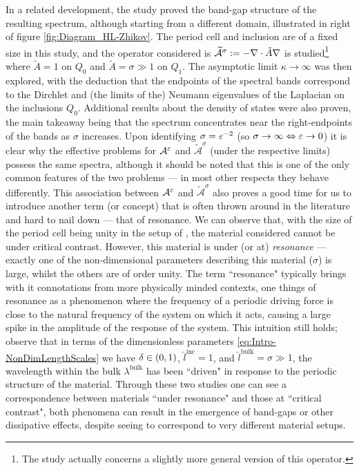 In a related development, the study \cite{hempel2000spectral} proved the band-gap structure of the resulting spectrum, although starting from a different domain, illustrated in right of figure \ref{fig:Diagram_HL-Zhikov}.
The period cell and inclusion are of a fixed size in this study, and the operator considered is $\widetilde{\mathcal{A}}^\sigma:=-\nabla\cdot\tilde{A}\nabla$ is studied\footnote{The study \cite{hempel2000spectral} actually concerns a slightly more general version of this operator.} where $\widetilde{A}=1$ on $Q_0$ and $\widetilde{A}=\sigma\gg 1$ on $Q_1$.
The asymptotic limit $\kappa\rightarrow\infty$ was then explored, with the deduction that the endpoints of the spectral bands correspond to the Dirchlet and (the limits of the) Neumann eigenvalues of the Laplacian on the inclusions $Q_0$.
Additional results about the density of states were also proven, the main takeaway being that the spectrum concentrates near the right-endpoints of the bands as $\sigma$ increases. 
Upon identifying $\sigma=\varepsilon^{-2}$ (so $\sigma\rightarrow\infty \Leftrightarrow \varepsilon\rightarrow0$) it is clear why the effective problems for $\mathcal{A}^{\varepsilon}$ and $\widetilde{\mathcal{A}}^{\sigma}$ (under the respective limits) possess the same spectra, although it should be noted that this is one of the only common features of the two problems --- in most other respects they behave differently.
This association between $\mathcal{A}^{\varepsilon}$ and $\widetilde{\mathcal{A}}^{\sigma}$ also proves a good time for us to introduce another term (or concept) that is often thrown around in the literature and hard to nail down --- that of resonance.
We can observe that, with the size of the period cell being unity in the setup of \cite{hempel2000spectral}, the material considered cannot be under critical contrast.
However, this material is under (or at) \emph{resonance} --- exactly one of the non-dimensional parameters describing this material ($\sigma$) is large, whilst the others are of order unity.
The term ``resonance" typically brings with it connotations from more physically minded contexts, one things of resonance as a phenomenon where the frequency of a periodic driving force is close to the natural frequency of the system on which it acts, causing a large spike in the amplitude of the response of the system.
This intuition still holds; observe that in terms of the dimensionless parameters \eqref{eq:Intro-NonDimLengthScales} we have $\delta\in\left( 0,1 \right)$, $\hat{l}^{\mathrm{inc}}=1$, and $\hat{l}^{\mathrm{bulk}}=\sigma\gg 1$, the wavelength within the bulk $\lambda^{\mathrm{bulk}}$ has been ``driven" in response to the periodic structure of the material.
Through these two studies one can see a correspondence between materials ``under resonance" and those at ``critical contrast", both phenomena can result in the emergence of band-gaps or other dissipative effects, despite seeing to correspond to very different material setups.

